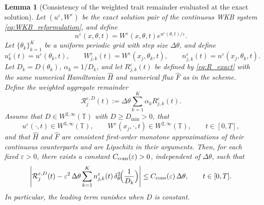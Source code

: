 \documentclass[11pt,a4paper]{ctexart}
\newtheorem{lemma}{Lemma}[section]
\begin{document}
\begin{lemma}[Consistency of the weighted trait remainder evaluated at the exact solution]\label{lem:consistency_R_divD}
Let \((u^\varepsilon,W^\varepsilon)\) be the exact solution pair of the continuous WKB system \eqref{eq:WKB_reformulation}, and define
\[
n^\varepsilon(x,\theta,t)=W^\varepsilon(x,\theta,t)e^{u^\varepsilon(\theta,t)/\varepsilon}.
\]
Let \(\{\theta_k\}_{k=1}^K\) be a uniform periodic grid with step size \(\Delta\theta\), and define
\[
u_k^\varepsilon(t)=u^\varepsilon(\theta_k,t),
\qquad
W_{j,k}^\varepsilon(t)=W^\varepsilon(x_j,\theta_k,t),
\qquad
n_{j,k}^\varepsilon(t)=n^\varepsilon(x_j,\theta_k,t).
\]
Let \(D_k=D(\theta_k)\), \(\alpha_k=1/D_k\), and let \(R_{j,k}^\varepsilon(t)\) be defined by \eqref{eq:R_exact} with the same numerical Hamiltonian \(\widehat H\) and numerical flux \(\widehat F\) as in the scheme. Define the weighted aggregate remainder
\[
\mathcal R_j^{\varepsilon,D}(t)
:=
\Delta\theta\sum_{k=1}^K \alpha_k R_{j,k}^\varepsilon(t).
\]
Assume that \(D\in W^{2,\infty}(\mathbb T)\) with \(D\ge D_{\min}>0\), that
\[
u^\varepsilon(\cdot,t)\in W^{3,\infty}(\mathbb T),
\qquad
W^\varepsilon(x_j,\cdot,t)\in W^{2,\infty}(\mathbb T),
\qquad t\in[0,T],
\]
and that \(\widehat H\) and \(\widehat F\) are consistent first-order monotone approximations of their continuous counterparts and are Lipschitz in their arguments. Then, for each fixed \(\varepsilon>0\), there exists a constant \(C_{\rm cons}(\varepsilon)>0\), independent of \(\Delta\theta\), such that
\begin{equation}\label{eq:consistency_main}
\left|
\mathcal R_j^{\varepsilon,D}(t)
-\varepsilon^2\,\Delta\theta\sum_{k=1}^K n_{j,k}^\varepsilon(t)\,\delta_\theta^2\!\Bigl(\frac1{D_k}\Bigr)
\right|
\le C_{\rm cons}(\varepsilon)\,\Delta\theta,
\qquad t\in[0,T].
\end{equation}
In particular, the leading term vanishes when \(D\) is constant.
\end{lemma}
\end{document}

